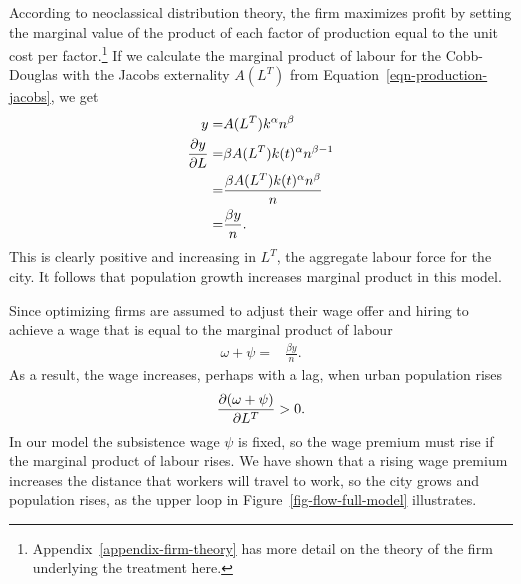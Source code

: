 According to \gls{neoclassical distribution theory}, the firm maximizes profit by setting the marginal value of the product of each \gls{factor of production} equal to the unit cost per factor.\footnote{Appendix~\ref{appendix-firm-theory} has more detail on the theory of the firm underlying the treatment here.} If we calculate the marginal product of labour for the Cobb-Douglas with the Jacobs externality $A(L^T)$ from Equation~\ref{eqn-production-jacobs}, we get 
\begin{align}\label{eqn-model-MPL}
y              =&  A(L^T) k^\alpha n^\beta \nonumber\\ 
\frac{\partial y}{\partial L}     =&\beta A(L^T) k(t)^\alpha n^{\beta-1} \nonumber\\
                =&\frac{\beta A(L^T) k(t)^\alpha n^\beta}{n} \nonumber\\
                =& \frac{\beta y}{n}.
\end{align}
This is clearly positive and increasing in $L^T$, the aggregate labour force for the city.  It follows that population growth increases marginal product in this model. 


Since optimizing firms are assumed to adjust their wage offer and hiring to achieve a wage that is equal to the marginal product of labour 
\begin{align}\label{eqn-model-MPL-w}
             \omega + \psi   =& \frac{\beta y}{n}.
\end{align}
As a result, the wage increases, perhaps with a lag, when urban population  rises 
\begin{equation}
 \frac{\partial (\omega + \psi)}{\partial L^T} >0.
\label{eqn-wage-population}
\end{equation}
In our model the subsistence wage $\psi$ is fixed, so the wage premium must rise if the marginal product of labour rises.  We have shown that a rising wage premium increases the distance that workers will travel to work, so the city grows and population rises, as the upper loop in Figure~\ref{fig-flow-full-model} illustrates. 

 

